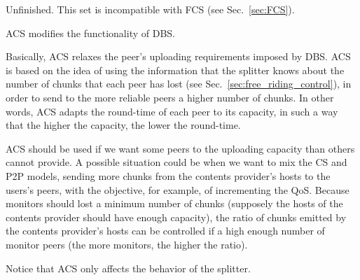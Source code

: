 
\label{sec:ACS}

\begin{notex}
  Unfinished. This set is incompatible with FCS (see
  Sec.~\ref{sec:FCS}).
\end{notex}

ACS modifies the functionality of DBS.

Basically, ACS relaxes the peer's uploading requirements imposed by
DBS. ACS is based on the idea of using the information that the
splitter knows about the number of chunks that each peer has lost (see
Sec.~\ref{sec:free_riding_control}), in order to send to the more reliable peers
a higher number of chunks. In other words, ACS adapts the round-time
of each peer to its capacity, in such a way that the higher the
capacity, the lower the \gls{round-time}. 

ACS should be used if we want some peers to  the uploading
capacity than others cannot provide. A possible situation could be
when we want to mix the CS and P2P models, sending more chunks from
the contents provider's hosts to the users's peers, with the
objective, for example, of incrementing the QoS. Because monitors
should lost a minimum number of chunks (supposely the hosts of the
contents provider should have enough capacity), the ratio of chunks
emitted by the contents provider's hosts can be controlled if a high
enough number of monitor peers (the more monitors, the higher the
ratio). 

Notice that ACS only affects the behavior of the splitter.

